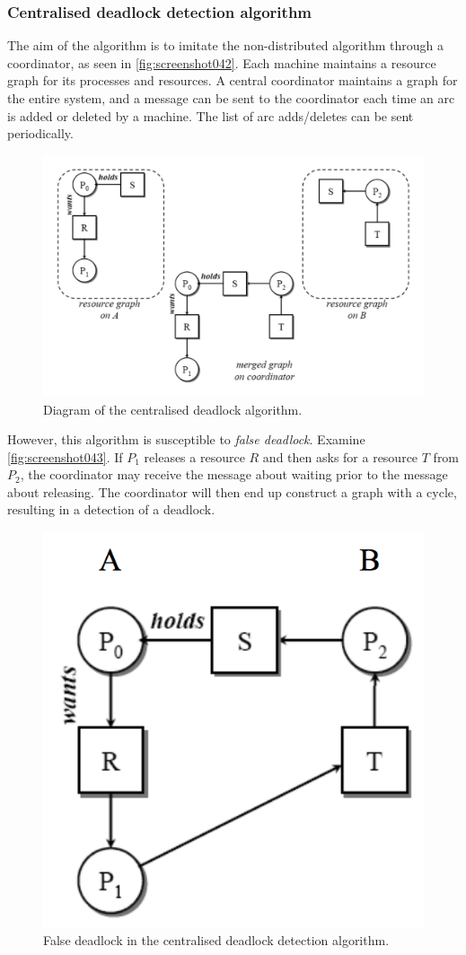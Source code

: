 \subsubsection{Centralised deadlock detection algorithm}
The aim of the algorithm is to imitate the non-distributed algorithm through a coordinator, as seen in \autoref{fig:screenshot042}. Each machine maintains a resource graph for its processes and resources. A central coordinator maintains a graph for the entire system, and a message can be sent to the coordinator each time an arc is added or deleted by a machine. The list of arc adds/deletes can be sent periodically.

\begin{figure}
\centering
\includegraphics[width=0.7\linewidth]{screenshot042}
\caption{Diagram of the centralised deadlock algorithm.}
\label{fig:screenshot042}
\end{figure}

However, this algorithm is susceptible to \textit{false deadlock}. Examine \autoref{fig:screenshot043}. If $P_1$ releases a resource $R$ and then asks for a resource $T$ from $P_2$, the coordinator may receive the message about waiting prior to the message about releasing. The coordinator will then end up construct a graph with a cycle, resulting in a detection of a deadlock.

\begin{figure}
\centering
\includegraphics[width=0.4\linewidth]{screenshot043}
\caption{False deadlock in the centralised deadlock detection algorithm.}
\label{fig:screenshot043}
\end{figure}

